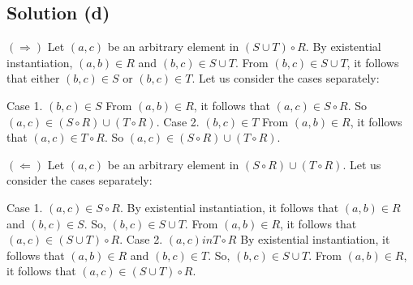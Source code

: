 \documentclass{article}
\begin{document}
\subsection{Solution (d)}

$(\Rightarrow)$ Let $(a,c)$ be an arbitrary element in $(S \cup T)
\circ R$. By existential instantiation, $(a,b) \in R$ and $(b,c) \in S
\cup T$. From $(b,c) \in S \cup T$, it follows that either $(b,c) \in
S$ or $(b,c) \in T$. Let us consider the cases separately:

Case 1. $(b,c) \in S$ From $(a,b) \in R$, it follows that $(a,c) \in S
\circ R$. So $(a,c) \in (S \circ R) \cup (T \circ R)$.
Case 2. $(b,c) \in T$ From $(a,b) \in R$, it follows that $(a,c) \in T
\circ R$. So $(a,c) \in (S \circ R) \cup (T \circ R)$.

$(\Leftarrow)$ Let $(a,c)$ be an arbitrary element in $(S \circ R)
\cup (T \circ R)$. Let us consider the cases separately:

Case 1. $(a,c) \in S \circ R$. By existential instantiation, it
follows that $(a,b) \in R$ and $(b,c) \in S$. So, $(b,c) \in S \cup
T$. From $(a,b) \in R$, it follows that $(a,c) \in (S \cup T) \circ R$.
Case 2. $(a,c) in T \circ R$ By existential instantiation, it follows
that $(a,b) \in R$ and $(b,c) \in T$. So, $(b,c) \in S \cup T$. From
$(a,b) \in R$, it follows that $(a,c) \in (S \cup T) \circ R$.
\end{document}
